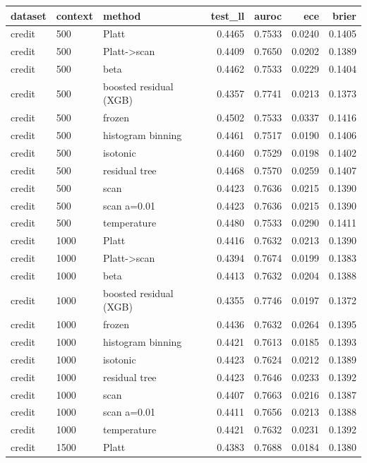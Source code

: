 \begin{tabular}{lllrrrr}
\toprule
dataset & context & method & test_ll & auroc & ece & brier \\
\midrule
credit & 500 & Platt & 0.4465 & 0.7533 & 0.0240 & 0.1405 \\
credit & 500 & Platt->scan & 0.4409 & 0.7650 & 0.0202 & 0.1389 \\
credit & 500 & beta & 0.4462 & 0.7533 & 0.0229 & 0.1404 \\
credit & 500 & boosted residual (XGB) & 0.4357 & 0.7741 & 0.0213 & 0.1373 \\
credit & 500 & frozen & 0.4502 & 0.7533 & 0.0337 & 0.1416 \\
credit & 500 & histogram binning & 0.4461 & 0.7517 & 0.0190 & 0.1406 \\
credit & 500 & isotonic & 0.4460 & 0.7529 & 0.0198 & 0.1402 \\
credit & 500 & residual tree & 0.4468 & 0.7570 & 0.0259 & 0.1407 \\
credit & 500 & scan & 0.4423 & 0.7636 & 0.0215 & 0.1390 \\
credit & 500 & scan a=0.01 & 0.4423 & 0.7636 & 0.0215 & 0.1390 \\
credit & 500 & temperature & 0.4480 & 0.7533 & 0.0290 & 0.1411 \\
credit & 1000 & Platt & 0.4416 & 0.7632 & 0.0213 & 0.1390 \\
credit & 1000 & Platt->scan & 0.4394 & 0.7674 & 0.0199 & 0.1383 \\
credit & 1000 & beta & 0.4413 & 0.7632 & 0.0204 & 0.1388 \\
credit & 1000 & boosted residual (XGB) & 0.4355 & 0.7746 & 0.0197 & 0.1372 \\
credit & 1000 & frozen & 0.4436 & 0.7632 & 0.0264 & 0.1395 \\
credit & 1000 & histogram binning & 0.4421 & 0.7613 & 0.0185 & 0.1393 \\
credit & 1000 & isotonic & 0.4423 & 0.7624 & 0.0212 & 0.1389 \\
credit & 1000 & residual tree & 0.4423 & 0.7646 & 0.0233 & 0.1392 \\
credit & 1000 & scan & 0.4407 & 0.7663 & 0.0216 & 0.1387 \\
credit & 1000 & scan a=0.01 & 0.4411 & 0.7656 & 0.0213 & 0.1388 \\
credit & 1000 & temperature & 0.4421 & 0.7632 & 0.0231 & 0.1392 \\
credit & 1500 & Platt & 0.4383 & 0.7688 & 0.0184 & 0.1380 \\

\end{tabular}
